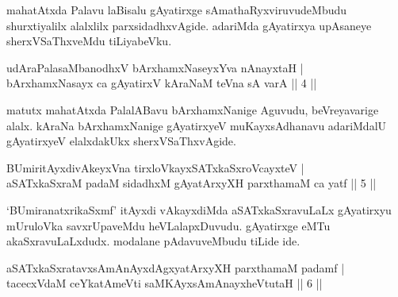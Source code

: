 \begin{artha} 
mahatAtxda Palavu laBisalu gAyatirxge sAmathaRyxviruvudeMbudu 
shurxtiyalilx alalxlilx parxsidadhxvAgide. adariMda gAyatirxya 
upAsaneye sherxVSaThxveMdu tiLiyabeVku.
\end{artha}

\begin{shl}
udAraPalasaMbanodhxV bArxhamxNaseyxYva nAnayxtaH | \\
bArxhamxNasayx ca gAyatirxV kAraNaM teVna sA varA \hfill ||  4 || 
\end{shl}

\begin{artha} 
matutx mahatAtxda PalalABavu bArxhamxNanige Aguvudu, beVreyavarige 
alalx. kAraNa bArxhamxNanige gAyatirxyeV muKayxsAdhanavu adariMdalU 
gAyatirxyeV elalxdakUkx sherxVSaThxvAgide.
\end{artha}

\begin{shl}
BUmiritAyxdivAkeyxVna tirxloVkayxSATxkaSxroVcayxteV | \\
aSATxkaSxraM padaM sidadhxM gAyatArxyXH parxthamaM ca yatf \hfill ||  5 || 
\end{shl}

\begin{artha} 
`BUmiranatxrikaSxmf' itAyxdi vAkayxdiMda aSATxkaSxravuLaLx gAyatirxyu 
mUruloVka savxrUpaveMdu heVLalapxDuvudu. gAyatirxge eMTu 
akaSxravuLaLxdudx. modalane pAdavuveMbudu tiLide ide.
\end{artha}

\begin{shl}
aSATxkaSxratavxsAmAnAyxdAgxyatArxyXH parxthamaM padamf  | \\
tacecxVdaM ceYkatAmeVti saMKAyxsAmAnayxheVtutaH \hfill ||  6 || 
\end{shl}

